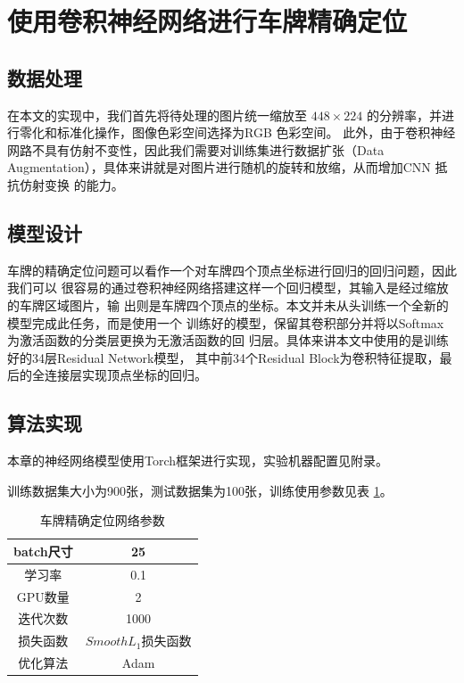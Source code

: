 \section{使用卷积神经网络进行车牌精确定位}

\subsection{数据处理}

在本文的实现中，我们首先将待处理的图片统一缩放至 $448 \times 224$ 的分辨率，并进
行零化和标准化操作，图像色彩空间选择为RGB 色彩空间。
此外，由于卷积神经网路不具有仿射不变性，因此我们需要对训练集进行数据扩张（Data
Augmentation），具体来讲就是对图片进行随机的旋转和放缩，从而增加CNN 抵抗仿射变换
的能力。

\subsection{模型设计}

车牌的精确定位问题可以看作一个对车牌四个顶点坐标进行回归的回归问题，因此我们可以
很容易的通过卷积神经网络搭建这样一个回归模型，其输入是经过缩放的车牌区域图片，输
出则是车牌四个顶点的坐标。本文并未从头训练一个全新的模型完成此任务，而是使用一个
训练好的模型，保留其卷积部分并将以Softmax 为激活函数的分类层更换为无激活函数的回
归层。具体来讲本文中使用的是训练好的34层Residual Network\cite{He:2015tt}模型，
其中前34个Residual Block为卷积特征提取，最后的全连接层实现顶点坐标的回归。

\subsection{算法实现}

本章的神经网络模型使用Torch框架进行实现，实验机器配置见附录。

训练数据集大小为900张，测试数据集为100张，训练使用参数见表 \ref{Tab:LocationArgs}。

\begin{table}[ht]
\centering
\caption{车牌精确定位网络参数}\label{Tab:LocationArgs}
\begin{tabular}{|c|c|}
\hline
batch尺寸 & 25 \\
\hline
学习率 & 0.1 \\
\hline
GPU数量 & 2 \\
\hline
迭代次数 & 1000 \\
\hline
损失函数 & $Smooth L_1$损失函数 \\
\hline
优化算法 & Adam\cite{Kingma:2014us} \\
\hline
\end{tabular}
\end{table}

